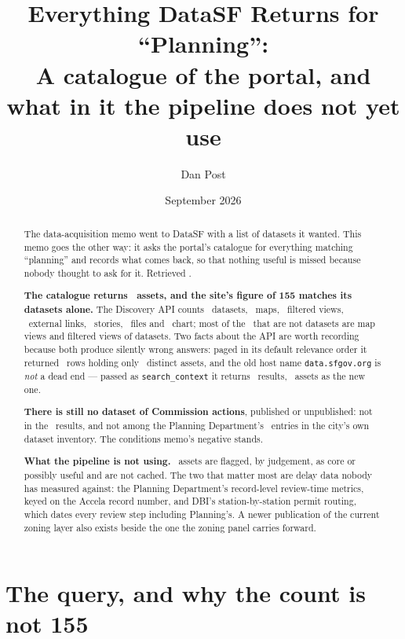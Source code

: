 \documentclass[11pt]{article}
\title{Everything DataSF Returns for ``Planning'':\\
\large A catalogue of the portal, and what in it the pipeline does not yet use}
\author{Dan Post}
\date{September 2026}
\begin{document}
\maketitle

\begin{abstract}
\noindent
The data-acquisition memo went to DataSF with a list of datasets it wanted. This memo goes
the other way: it asks the portal's catalogue for everything matching ``planning'' and
records what comes back, so that nothing useful is missed because nobody thought to ask for
it. Retrieved \catRetrieved.

\medskip\noindent
\textbf{The catalogue returns \catTotal\ assets, and the site's figure of 155 matches its
datasets alone.} The Discovery API counts \catDatasets\ datasets, \catMaps\ maps, \catFilters\
filtered views, \catLinks\ external links, \catStories\ stories, \catFiles\ files and
\catCharts\ chart; most of the \catNonDatasets\ that are not datasets are map views and
filtered views of datasets. Two facts about the
API are worth recording because both produce silently wrong answers: paged in its default
relevance order it returned \catRelPagingRows\ rows holding only \catRelPagingDistinct\
distinct assets, and the old host name \texttt{data.sfgov.org} is \emph{not} a dead end ---
passed as \texttt{search\_context} it returns \catOldHostCount\ results, \catOldHostSameIds\
assets as the new one.

\medskip\noindent
\textbf{There is still no dataset of Commission actions}, published or unpublished: not in
the \catTotal\ results, and not among the Planning Department's \catInvPlanning\ entries in
the city's own dataset inventory. The conditions memo's negative stands.

\medskip\noindent
\textbf{What the pipeline is not using.} \catPossibleNotCached\ assets are flagged, by
judgement, as core or possibly useful and are not cached. The two that matter most are
delay data nobody has measured against: the Planning Department's record-level review-time
metrics, keyed on the Accela record number, and DBI's station-by-station permit routing,
which dates every review step including Planning's. A newer publication of the current
zoning layer also exists beside the one the zoning panel carries forward.
\end{abstract}

\tableofcontents
\newpage

\section{The query, and why the count is not 155}
\end{document}
